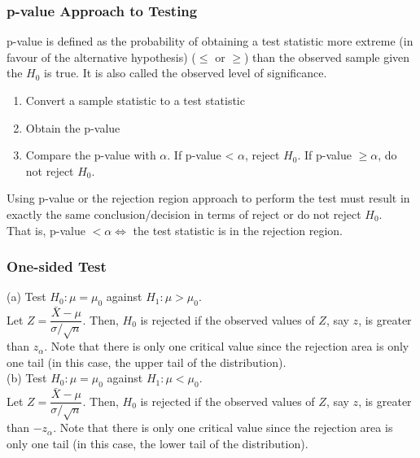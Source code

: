 \subsubsection{p-value Approach to Testing}
\begin{definition}[p-value]
p-value is defined as the probability of obtaining a test statistic more extreme (in favour of the alternative hypothesis) ($\leq$ or $\geq$) than the observed sample given the $H_0$ is true. It is also called the observed level of significance.
\end{definition}
\begin{enumerate}
    \item Convert a sample statistic to a test statistic
    \item Obtain the p-value
    \item Compare the p-value with $\alpha$. If p-value < $\alpha$, reject $H_0$. If p-value $\geq \alpha$, do not reject $H_0$.
\end{enumerate}
\begin{note}
\end{note}
Using p-value or the rejection region approach to perform the test must result in exactly the same conclusion/decision in terms of reject or do not reject $H_0$. \\
That is, p-value $ < \alpha \iff$ the test statistic is in the rejection region.
\begin{note}
\end{note}
\subsubsection{One-sided Test}
(a) Test $H_0: \mu = \mu_0$ against $H_1: \mu > \mu_0$. \\
Let $Z = \dfrac{\bar{X} - \mu }{\sigma/\sqrt{n}}$. Then, $H_0$ is rejected if the observed values of $Z$, say $z$, is greater than $z_{\alpha}$. Note that there is only one critical value since the rejection area is only one tail (in this case, the upper tail of the distribution).\\
(b) Test $H_0: \mu = \mu_0$ against $H_1: \mu < \mu_0$. \\
Let $Z = \dfrac{\bar{X} - \mu }{\sigma/\sqrt{n}}$. Then, $H_0$ is rejected if the observed values of $Z$, say $z$, is greater than $-z_{\alpha}$. Note that there is only one critical value since the rejection area is only one tail (in this case, the lower tail of the distribution).
